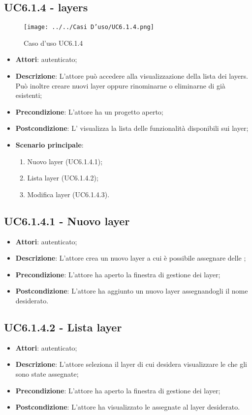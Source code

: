 \subsection{UC6.1.4 - layers}
\label{ssec:UC6.1.4}
\begin{figure}[h!]
\centering
\texttt{[image: ../../Casi D'uso/UC6.1.4.png]}
\caption{Caso d'uso UC6.1.4}
 \end{figure}
\begin{itemize}
\item \textbf{Attori}:  autenticato;
\item \textbf{Descrizione}: L’attore  può accedere alla visualizzazione della lista dei layers. Può inoltre creare nuovi layer oppure rinominarne o eliminarne di già esistenti;
\item \textbf{Precondizione}: L’attore ha un progetto aperto;
\item \textbf{Postcondizione}: L' visualizza la lista delle funzionalità disponibili sui layer;
\item \textbf{Scenario principale}: \begin{enumerate}\item Nuovo layer (UC6.1.4.1);\item Lista layer (UC6.1.4.2);\item Modifica layer (UC6.1.4.3).
 \end{enumerate}
\end{itemize}
\subsection{UC6.1.4.1 - Nuovo layer}
\label{ssec:UC6.1.4.1}
\begin{itemize}
\item \textbf{Attori}:  autenticato;
\item \textbf{Descrizione}: L'attore crea un nuovo layer a cui è possibile assegnare delle ;
\item \textbf{Precondizione}: L'attore ha aperto la finestra di gestione dei layer;
\item \textbf{Postcondizione}: L'attore ha aggiunto un nuovo layer assegnandogli il nome desiderato.
\end{itemize}
\subsection{UC6.1.4.2 - Lista layer}
\label{ssec:UC6.1.4.2}
\begin{itemize}
\item \textbf{Attori}:  autenticato;
\item \textbf{Descrizione}: L'attore seleziona il layer di cui desidera visualizzare le  che gli sono state assegnate;
\item \textbf{Precondizione}: L'attore ha aperto la finestra di gestione dei layer;
\item \textbf{Postcondizione}: L'attore ha visualizzato le  assegnate al layer desiderato.
\end{itemize}
\newpage
